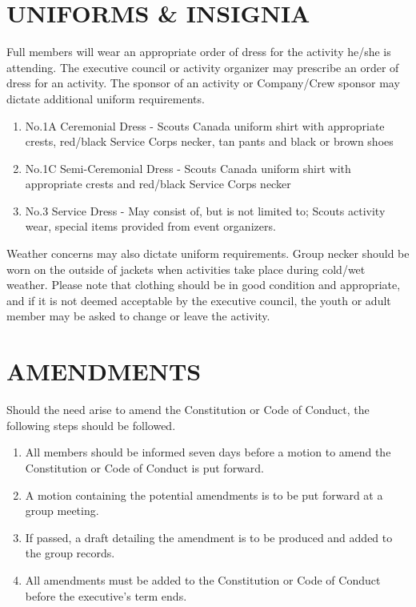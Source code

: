 \documentclass{Service_Corps_Document}
\begin{document}
\section{UNIFORMS \& INSIGNIA}
Full members will wear an appropriate order of dress for the activity he/she is attending. The executive council or activity organizer may prescribe an order of dress for an activity. The sponsor of an activity or Company/Crew sponsor may dictate additional uniform requirements.
\begin{enumerate}
	\item No.1A Ceremonial Dress - Scouts Canada uniform shirt with appropriate crests, red/black Service Corps necker, tan pants and black or brown shoes
	\item No.1C Semi-Ceremonial Dress - Scouts Canada uniform shirt with appropriate crests and red/black Service Corps necker
	\item No.3 Service Dress - May consist of, but is not limited to; Scouts activity wear, special items provided from event organizers.
\end{enumerate}
Weather concerns may also dictate uniform requirements. Group necker should be worn on the outside of jackets when activities take place during cold/wet weather. Please note that clothing should be in good condition and appropriate, and if it is not deemed acceptable by the executive council, the youth or adult member may be asked to change or leave the activity.
\section{AMENDMENTS}
Should the need arise to amend the Constitution or Code of Conduct, the following steps should be followed. 
\begin{enumerate}
	\item All members should be informed seven days before a motion to amend the Constitution or Code of Conduct is put forward.
	\item A motion containing the potential amendments is to be put forward at a group meeting.
	\item If passed, a draft detailing the amendment is to be produced and added to the group records.
	\item All amendments must be added to the Constitution or Code of Conduct before the executive's term ends.
\end{enumerate}
\end{document}
